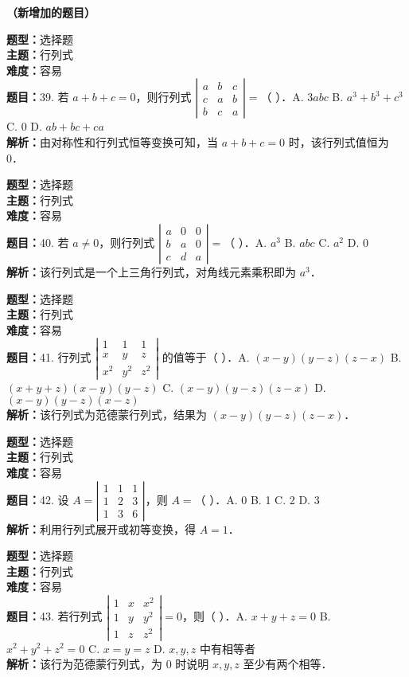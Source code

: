 \documentclass{ctexart}
\newenvironment{question}[5]{%
	\noindent\textbf{题型：}#1\\
	\textbf{主题：}#2\\
	\textbf{难度：}#3\\
	\textbf{题目：}#4\\
	\textbf{解析：}#5\\
	\vspace{1em}
}{}
\begin{document}
\textbf{（新增加的题目）}

\begin{question}
	{选择题}
	{行列式}
	{容易}
	{39. 若 $a+b+c=0$，则行列式 $\left|\begin{array}{ccc}a & b & c \\ c & a & b \\ b & c & a\end{array}\right|=$（ ）．A. $3abc$ B. $a^3+b^3+c^3$ C. 0 D. $ab+bc+ca$}
	{由对称性和行列式恒等变换可知，当 $a+b+c=0$ 时，该行列式值恒为 0．}
\end{question}

\begin{question}
	{选择题}
	{行列式}
	{容易}
	{40. 若 $a \neq 0$，则行列式 $\left|\begin{array}{ccc}a & 0 & 0 \\ b & a & 0 \\ c & d & a\end{array}\right|=$（ ）．A. $a^3$ B. $abc$ C. $a^2$ D. 0}
	{该行列式是一个上三角行列式，对角线元素乘积即为 $a^3$．}
\end{question}

\begin{question}
	{选择题}
	{行列式}
	{容易}
	{41. 行列式 $\left|\begin{array}{ccc}1 & 1 & 1 \\ x & y & z \\ x^2 & y^2 & z^2\end{array}\right|$ 的值等于（ ）．A. $(x-y)(y-z)(z-x)$ B. $(x+y+z)(x-y)(y-z)$ C. $(x-y)(y-z)(z-x)$ D. $(x-y)(y-z)(x-z)$}
	{该行列式为范德蒙行列式，结果为 $(x - y)(y - z)(z - x)$．}
\end{question}

\begin{question}
	{选择题}
	{行列式}
	{容易}
	{42. 设 $A=\left|\begin{array}{ccc}1 & 1 & 1 \\ 1 & 2 & 3 \\ 1 & 3 & 6\end{array}\right|$，则 $A=$（ ）．A. 0 B. 1 C. 2 D. 3}
	{利用行列式展开或初等变换，得 $A=1$．}
\end{question}

\begin{question}
	{选择题}
	{行列式}
	{容易}
	{43. 若行列式 $\left|\begin{array}{ccc}1 & x & x^2 \\ 1 & y & y^2 \\ 1 & z & z^2\end{array}\right|=0$，则（ ）．A. $x+y+z=0$ B. $x^2+y^2+z^2=0$ C. $x=y=z$ D. $x,y,z$ 中有相等者}
	{该行为范德蒙行列式，为 0 时说明 $x,y,z$ 至少有两个相等．}
\end{question}
\end{document}
